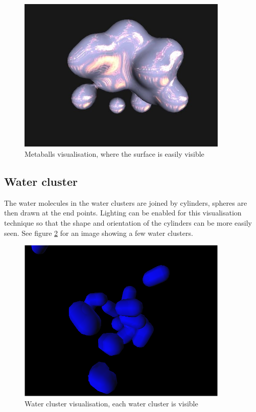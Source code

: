 \begin{figure}[h!]
  \begin{center}
    \includegraphics[width=100mm]{metaballs}
  \end{center}
  \caption{Metaballs visualisation, where the surface is easily visible}
  \label{fig:implementation_metaballs}
\end{figure}


\subsection{Water cluster}
\label{sub:implementation_cluster}

The water molecules in the water clusters are joined by cylinders, spheres are
then drawn at the end points. Lighting can be enabled for this visualisation
technique so that the shape and orientation of the cylinders can be more easily
seen. See figure \ref{fig:implementation_watercluster} for an image showing a
few water clusters.

\begin{figure}[h!]
  \begin{center}
    \includegraphics[width=100mm]{watercluster}
  \end{center}
  \caption{Water cluster visualisation, each water cluster is visible}
  \label{fig:implementation_watercluster}
\end{figure}

